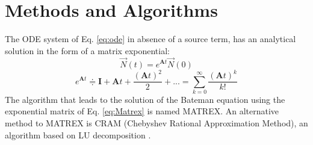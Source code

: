 \documentclass[a4paper,titlepage]{article}
\newcommand{\nvec}{\ensuremath{\vec{N}}}
\begin{document}
\section{Methods and Algorithms}
\label{S:2}
The ODE system of Eq. \ref{eq:ode} in absence of a source term, has an analytical solution in the form of a matrix exponential:
\begin{equation}
    \nvec(t)=e^{\textbf{A}t}\nvec(0)
    \label{eq:sys}
\end{equation}
\begin{equation}
   e ^{\textbf{A}t}\doteqdot\textbf{I}+\textbf{A}t+\frac{(\textbf{A}t)^2}{2}+...=\sum_{k=0}^\infty\frac{(\textbf{A}t)^k}{k!}
    \label{eq:Matrex}
\end{equation}
The algorithm that leads to the solution of the Bateman equation using the exponential matrix of Eq. \ref{eq:Matrex} is named MATREX. An alternative method to MATREX is CRAM (Chebyshev Rational Approximation Method), an algorithm based on LU decomposition \cite{vondy1962development}\cite{pusa2010computing}\cite{isotalo2011comparison}.
\end{document}
